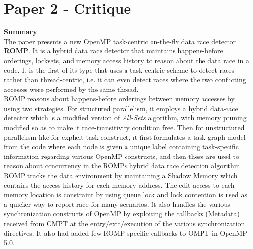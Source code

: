 \documentclass[a4paper]{article}
\begin{document}
\newpage


 \section{Paper 2 - Critique} 
\vspace{0.5cm}
{\bf\Large Summary} \\

The paper presents a new OpenMP task-centric on-the-fly data race detector {\bf ROMP}. It is a hybrid data race detector that maintains happens-before orderings, locksets, and memory access history to reason about the data race in a code. It is the first of its type that uses a task-centric scheme to detect races rather than thread-centric, i.e. it can even detect races where the two conflicting accesses were performed by the same thread.\\

ROMP reasons about happens-before orderings between memory accesses by using two strategies. For structured parallelism, it employs a hybrid data-race detector which is a modified version of {\it All-Sets} algorithm, with memory pruning modified so as to make it race-transitivity condition free. Then for unstructured parallelism like for explicit task construct, it first formulates a task graph model from the code where each node is given a unique label containing task-specific information regarding various OpenMP constructs, and then these are used to reason about concurrency in the ROMPs hybrid data race detection algorithm. \\

ROMP tracks the data environment by maintaining a Shadow Memory which contains the access history for each memory address. The edit-access to each memory location is constraint by using queue lock and lock contention is used as a quicker way to report race for many scenarios. It also handles the various synchronization constructs of OpenMP by exploiting the callbacks (Metadata) received from OMPT at the entry/exit/execution of the various synchronization directives. It also had added few ROMP specific callbacks to OMPT in OpenMP 5.0. \\
\end{document}
